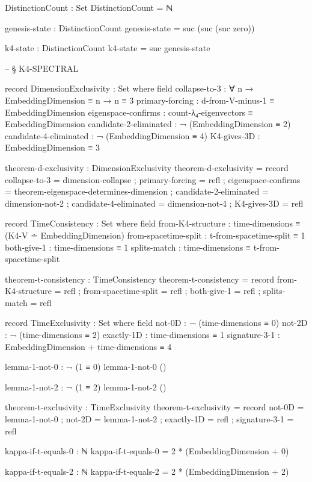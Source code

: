 \documentclass[11pt,a4paper]{book}
\begin{document}
\begin{code}
DistinctionCount : Set
DistinctionCount = ℕ

genesis-state : DistinctionCount
genesis-state = suc (suc (suc zero))

k4-state : DistinctionCount
k4-state = suc genesis-state


-- § K4-SPECTRAL

record DimensionExclusivity : Set where
  field
    collapse-to-3            : ∀ n → EmbeddingDimension ≡ n → n ≡ 3
    primary-forcing          : d-from-V-minus-1 ≡ EmbeddingDimension
    eigenspace-confirms      : count-λ₄-eigenvectors ≡ EmbeddingDimension
    candidate-2-eliminated   : ¬ (EmbeddingDimension ≡ 2)
    candidate-4-eliminated   : ¬ (EmbeddingDimension ≡ 4)
    K4-gives-3D              : EmbeddingDimension ≡ 3

theorem-d-exclusivity : DimensionExclusivity
theorem-d-exclusivity = record
  { collapse-to-3 = dimension-collapse
  ; primary-forcing = refl
  ; eigenspace-confirms = theorem-eigenspace-determines-dimension
  ; candidate-2-eliminated = dimension-not-2
  ; candidate-4-eliminated = dimension-not-4
  ; K4-gives-3D  = refl
  }

record TimeConsistency : Set where
  field
    from-K4-structure     : time-dimensions ≡ (K4-V ∸ EmbeddingDimension)
    from-spacetime-split  : t-from-spacetime-split ≡ 1
    both-give-1           : time-dimensions ≡ 1
    splits-match          : time-dimensions ≡ t-from-spacetime-split

theorem-t-consistency : TimeConsistency
theorem-t-consistency = record
  { from-K4-structure    = refl
  ; from-spacetime-split = refl
  ; both-give-1          = refl
  ; splits-match         = refl
  }

record TimeExclusivity : Set where
  field
    not-0D         : ¬ (time-dimensions ≡ 0)
    not-2D         : ¬ (time-dimensions ≡ 2)
    exactly-1D     : time-dimensions ≡ 1
    signature-3-1  : EmbeddingDimension + time-dimensions ≡ 4

lemma-1-not-0 : ¬ (1 ≡ 0)
lemma-1-not-0 ()

lemma-1-not-2 : ¬ (1 ≡ 2)
lemma-1-not-2 ()

theorem-t-exclusivity : TimeExclusivity
theorem-t-exclusivity = record
  { not-0D         = lemma-1-not-0
  ; not-2D         = lemma-1-not-2
  ; exactly-1D     = refl
  ; signature-3-1  = refl
  }

kappa-if-t-equals-0 : ℕ
kappa-if-t-equals-0 = 2 * (EmbeddingDimension + 0)

kappa-if-t-equals-2 : ℕ
kappa-if-t-equals-2 = 2 * (EmbeddingDimension + 2)


\end{code}
\end{document}
